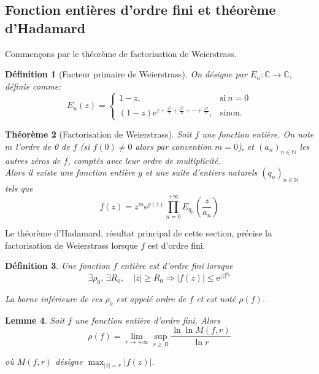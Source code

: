 \documentclass[french]{report}
\newtheorem{theorem}{Théorème}[section]
\newtheorem{definition}[theorem]{Définition}
\newtheorem{lemma}[theorem]{Lemme}
\begin{document}
\subsection{Fonction entières d'ordre fini et théorème d'Hadamard}

Commençons par le théorème de factorisation de Weierstrass.

\begin{definition}[Facteur primaire de Weierstrass]
  On désigne par $E_n:\mathbb{C}\to\mathbb{C}$, définie comme:
  \begin{equation*}
    E_n(z)=
    \begin{cases}
      1-z, & \text{si}\ n=0\\
      (1-z)\mathrm{e}^{z+\frac{z^2}{2}+\frac{z^3}{3}+\cdots+\frac{z^n}{n}}, & \text{sinon}.
    \end{cases}
  \end{equation*}
\end{definition}

\begin{theorem}[Factorisation de Weierstrass]\label{thm:factorisation-weierstrass}
  Soit $f$ une fonction entière. On note $m$ l'ordre de 0 de $f$ (si $f(0)\neq 0$ alors par convention $m=0$), et $(a_n)_{n\in\mathbb{N}}$ les autres zéros de $f$, comptés avec leur ordre de multiplicité.
  \\

  Alors il existe une fonction entière $g$ et une suite d'entiers naturels $(q_n)_{n\in\mathbb{N}}$ tels que
  \[
    f(z)=z^m\mathrm{e}^{g(z)}\prod_{n=0}^{+\infty}E_{q_n}\left(\frac{z}{a_n}\right)
  \]
\end{theorem}

Le théorème d'Hadamard, résultat principal de cette section, précise la factorisation de Weierstrass lorsque $f$ est d'ordre fini.

\begin{definition}
  Une fonction $f$ entière est d'ordre fini lorsque
  \[
   \exists \rho_0,\,\exists R_0,\quad
   |z|\geq R_0\Longrightarrow|f(z)|\leq\mathrm{e}^{|z|^{\rho_0}}
  \]

  La borne inférieure de ces $\rho_0$ est appelé ordre de $f$ et est noté $\rho(f)$.
\end{definition}

\begin{lemma}
  Soit $f$ une fonction entière d'ordre fini. Alors
  \[
    \rho(f)=\lim_{r\to+\infty}\sup_{r\geq R}
    \frac{\ln\ln M(f,r)}{\ln r}
  \]

  où $M(f,r)$ désigne $\max_{|z|=r}|f(z)|$.
\end{lemma}
\end{document}
